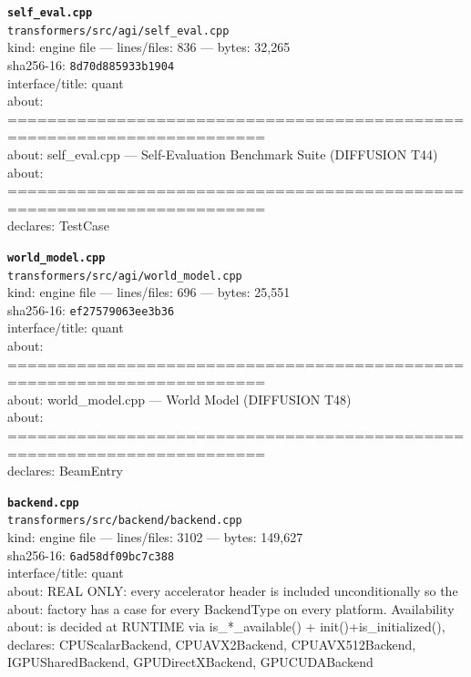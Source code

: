 \noindent\textbf{\texttt{self\_eval.cpp}}\\
\texttt{transformers/src/agi/self\_eval.cpp}\\
kind: engine file --- lines/files: 836 --- bytes: 32,265\\
sha256-16: \texttt{8d70d885933b1904}\\
interface/title: quant\\
about: ========================================================================\\
about: self\_eval.cpp — Self-Evaluation Benchmark Suite (DIFFUSION T44)\\
about: ========================================================================\\
declares: TestCase\\
\vspace*{6.0pt}

\noindent\textbf{\texttt{world\_model.cpp}}\\
\texttt{transformers/src/agi/world\_model.cpp}\\
kind: engine file --- lines/files: 696 --- bytes: 25,551\\
sha256-16: \texttt{ef27579063ee3b36}\\
interface/title: quant\\
about: ========================================================================\\
about: world\_model.cpp — World Model (DIFFUSION T48)\\
about: ========================================================================\\
declares: BeamEntry\\
\vspace*{6.0pt}
\newpage

\noindent\textbf{\texttt{backend.cpp}}\\
\texttt{transformers/src/backend/backend.cpp}\\
kind: engine file --- lines/files: 3102 --- bytes: 149,627\\
sha256-16: \texttt{6ad58df09bc7c388}\\
interface/title: quant\\
about: REAL ONLY: every accelerator header is included unconditionally so the\\
about: factory has a case for every BackendType on every platform. Availability\\
about: is decided at RUNTIME via is\_*\_available() + init()+is\_initialized(),\\
declares: CPUScalarBackend, CPUAVX2Backend, CPUAVX512Backend, IGPUSharedBackend, GPUDirectXBackend, GPUCUDABackend\\
\vspace*{6.0pt}


